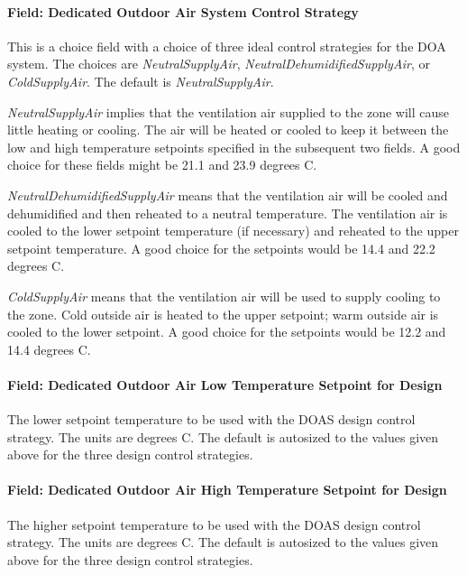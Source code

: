 \paragraph{Field: Dedicated Outdoor Air System Control Strategy}\label{field-dedicated-outdoor-air-system-control-strategy}

This is a choice field with a choice of three ideal control strategies for the DOA system. The choices are \emph{NeutralSupplyAir}, \emph{NeutralDehumidifiedSupplyAir}, or \emph{ColdSupplyAir}. The default is \emph{NeutralSupplyAir}.

\emph{NeutralSupplyAir} implies that the ventilation air supplied to the zone will cause little heating or cooling. The air will be heated or cooled to keep it between the low and high temperature setpoints specified in the subsequent two fields. A good choice for these fields might be 21.1 and 23.9 degrees C.

\emph{NeutralDehumidifiedSupplyAir} means that the ventilation air will be cooled and dehumidified and then reheated to a neutral temperature. The ventilation air is cooled to the lower setpoint temperature (if necessary) and reheated to the upper setpoint temperature. A good choice for the setpoints would be 14.4 and 22.2 degrees C.

\emph{ColdSupplyAir} means that the ventilation air will be used to supply cooling to the zone. Cold outside air is heated to the upper setpoint; warm outside air is cooled to the lower setpoint. A good choice for the setpoints would be 12.2 and 14.4 degrees C.

\paragraph{Field: Dedicated Outdoor Air Low Temperature Setpoint for Design}\label{field-dedicated-outdoor-air-low-temperatue-setpoint-for-design}

The lower setpoint temperature to be used with the DOAS design control strategy. The units are degrees C. The default is autosized to the values given above for the three design control strategies.

\paragraph{Field: Dedicated Outdoor Air High Temperature Setpoint for Design}\label{field-dedicated-outdoor-air-high-temperature-setpoint-for-design}

The higher setpoint temperature to be used with the DOAS design control strategy. The units are degrees C. The default is autosized to the values given above for the three design control strategies.

